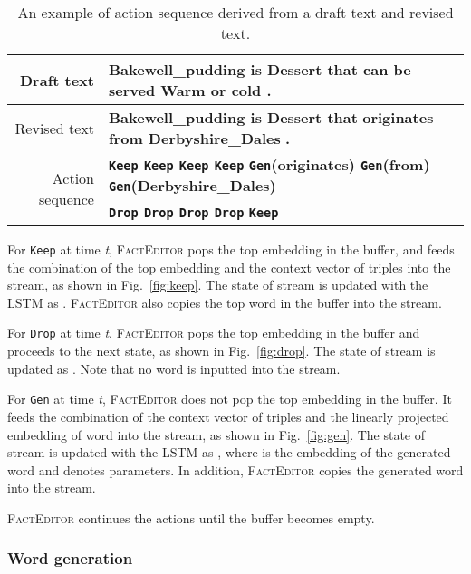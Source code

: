 \documentclass[11pt,a4paper]{article}
\newcommand{\orange}[1]{{\color[HTML]{ff7f0e}\textbf{#1}}}
\newcommand{\blue}[1]{{\color[HTML]{1f77b4}\textbf{#1}}}
\newcommand{\green}[1]{{\color[HTML]{2ca02c}\textbf{#1}}}
\begin{document}
\begin{table*}[t]
    \centering
    \small
    \begin{tabular}{r|l}
        \toprule
        Draft text  & \green{Bakewell\_pudding} \green{is} \green{Dessert} \green{that} \orange{can be served Warm or cold} \green{.} \\\midrule
        Revised text  & \green{Bakewell\_pudding is Dessert that} \blue{originates from Derbyshire\_Dales} \green{.}\\\midrule
        \multirow{2}{*}{Action sequence } & \green{\texttt{Keep} \texttt{Keep} \texttt{Keep} \texttt{Keep}} \blue{\texttt{Gen}(originates) \texttt{Gen}(from) \texttt{Gen}(Derbyshire\_Dales)}\\
        & \orange{\texttt{Drop} \texttt{Drop} \texttt{Drop} \texttt{Drop}} \green{\texttt{Keep}}\\
        \bottomrule
    \end{tabular}
    \caption{An example of action sequence derived from a draft text and revised text.}
    \label{tab:action}
\end{table*}
For \texttt{Keep} at time \textit{t}, \textsc{FactEditor} pops the top embedding  in the buffer, and feeds the combination of the top embedding  and the context vector of triples  into the stream, as shown in Fig.~\ref{fig:keep}. The state of stream is updated with the \textsc{LSTM} as 
.  \textsc{FactEditor} also copies the top word in the buffer into the stream.

For \texttt{Drop} at time \textit{t}, \textsc{FactEditor} pops the top embedding in the buffer and proceeds to the next state, as shown in Fig.~\ref{fig:drop}. The state of stream is updated as . Note that no word is inputted into the stream.

For \texttt{Gen} at time \textit{t}, \textsc{FactEditor} does not pop the top embedding in the buffer. It feeds the combination of the context vector of triples  and the linearly projected embedding of word  into the stream, as shown in Fig.~\ref{fig:gen}. The state of stream is updated with the LSTM as
, 
where  is the embedding of the generated word  and  denotes parameters. In addition, \textsc{FactEditor} copies the generated word  into the stream.

\textsc{FactEditor} continues the actions until the buffer becomes empty.

\subsubsection*{Word generation}
\end{document}
